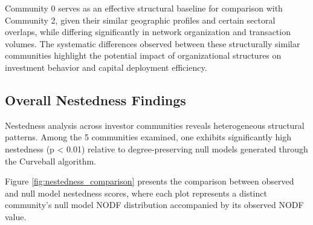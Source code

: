 Community 0 serves as an effective structural baseline for comparison with Community 2, given their similar geographic profiles and certain sectoral overlaps, while differing significantly in network organization and transaction volumes. The systematic differences observed between these structurally similar communities highlight the potential impact of organizational structures on investment behavior and capital deployment efficiency.

\subsection{Overall Nestedness Findings}

\newcommand{\numCommAnalysedNestedness}{5}

Nestedness analysis across investor communities reveals heterogeneous structural patterns. Among the \numCommAnalysedNestedness{} communities examined, one exhibits significantly high nestedness (p < 0.01) relative to degree-preserving null models generated through the Curveball algorithm.

Figure \ref{fig:nestedness_comparison} presents the comparison between observed and null model nestedness scores, where each plot represents a distinct community's null model NODF distribution accompanied by its observed NODF value.


